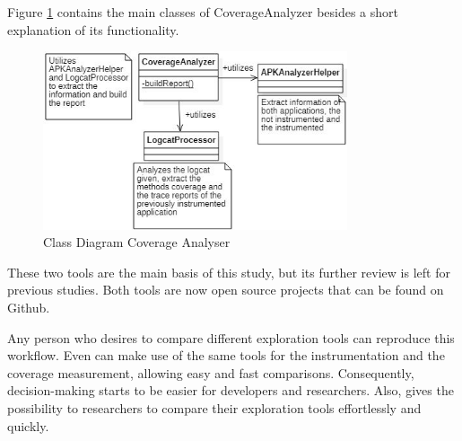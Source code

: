 Figure \ref{fig:ca} contains the main classes of CoverageAnalyzer besides a short explanation of its functionality.

\begin{figure}[h]
\centering
\includegraphics[width=0.8\textwidth]{../Figures/ClassDiagramCA.jpg}
\caption{Class Diagram Coverage Analyser}\label{fig:ca}
\end{figure}

These two tools are the main basis of this study, but its further review is left for previous studies. Both tools are now open source projects that can be found on Github.

Any person who desires to compare different exploration tools can reproduce this workflow. Even can make use of the same tools for the instrumentation and the coverage measurement, allowing easy and fast comparisons. Consequently, decision-making starts to be easier for developers and researchers. Also, gives the possibility to researchers to compare their exploration tools effortlessly and quickly.